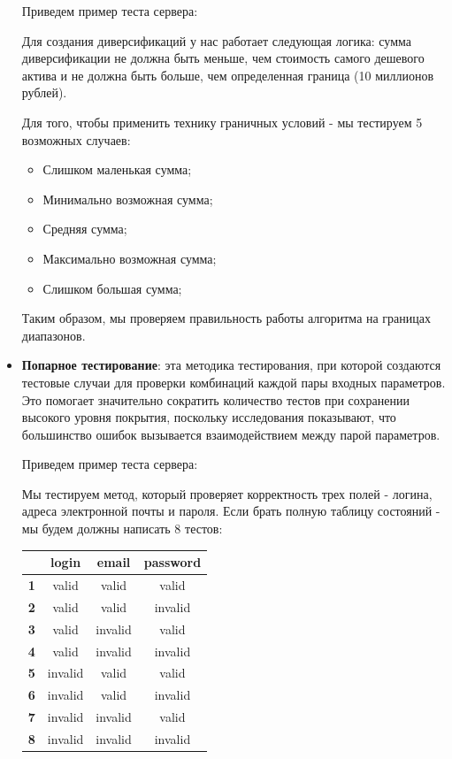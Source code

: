 \documentclass[a4paper, 14pt]{article}
\begin{document}
\begin{itemize}
    Приведем пример теста сервера:

    Для создания диверсификаций у нас работает следующая логика: сумма диверсификации не должна быть меньше, чем стоимость самого дешевого актива и не должна быть больше, чем определенная граница (10 миллионов рублей).

    Для того, чтобы применить технику граничных условий - мы тестируем 5 возможных случаев:
    \begin{itemize}
        \item Слишком маленькая сумма;
        \item Минимально возможная сумма;
        \item Средняя сумма;
        \item Максимально возможная сумма;
        \item Слишком большая сумма;
    \end{itemize}

    Таким образом, мы проверяем правильность работы алгоритма на границах диапазонов.

    \item \textbf{Попарное тестирование}: эта методика тестирования, при которой создаются тестовые случаи для проверки комбинаций каждой пары входных параметров. Это помогает значительно сократить количество тестов при сохранении высокого уровня покрытия, поскольку исследования показывают, что большинство ошибок вызывается взаимодействием между парой параметров.

    Приведем пример теста сервера:

    Мы тестируем метод, который проверяет корректность трех полей - логина, адреса электронной почты и пароля. Если брать полную таблицу состояний - мы будем должны написать 8 тестов:

    \begin{table}[H]
        \centering
        \begin{tabular}{|c|c|c|c|}
        \hline
        \textbf{}  & \textbf{login} & \textbf{email} & \textbf{password} \\ \hline
        \textbf{1} & valid          & valid          & valid             \\ \hline
        \textbf{2} & valid          & valid          & invalid           \\ \hline
        \textbf{3} & valid          & invalid        & valid             \\ \hline
        \textbf{4} & valid          & invalid        & invalid           \\ \hline
        \textbf{5} & invalid        & valid          & valid             \\ \hline
        \textbf{6} & invalid        & valid          & invalid           \\ \hline
        \textbf{7} & invalid        & invalid        & valid             \\ \hline
        \textbf{8} & invalid        & invalid        & invalid           \\ \hline
        \end{tabular}
    \end{table}


\end{itemize}
\end{document}
